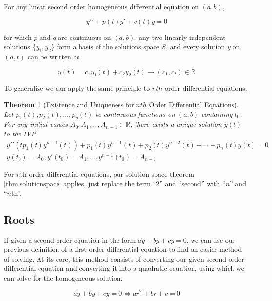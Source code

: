 \documentclass[12pt, landscape, twocolumn]{article}
\newtheorem{thm}{Theorem}
\begin{document}
    For any linear second order homogeneous differential equation on $(a, b)$,

        \[
            y\prime\prime + p(t) y\prime + q(t)y = 0
        \]

    for which $p$ and $q$ are continuous on $(a, b)$, any two linearly independent solutions $\{y_1, y_2\}$ form a basis of the solutions space $S$, and every solution $y$ on $(a, b)$ can be written as

        \[
            y(t) = c_1 y_1(t) + c_2 y_2(t) \to (c_1, c_2) \in \mathbb{R}
        \]

    To generalize we can apply the same principle to $nth$ order differential equations.

        \begin{thm}[Existence and Uniqueness for $nth$ Order Differential Equations]\label{thm:neau}
        Let $p_1(t), p_2(t), \dots, p_n(t)$ be continuous functions on $(a, b)$ containing $t_0$. For any initial values $A_0, A_1, \dots, A_{n-1} \in \mathbb{R}$, there exists a unique solution $y(t)$ to the IVP
        \[
        \begin{aligned}
            y\prime\prime(tp_1(t)y^{n - 1}(t)) + p_1(t)y^{n - 1}(t) + p_2(t)y^{n - 2}(t) + \cdots + p_n(t)y(t) = 0\\
            y(t_0) = A_0, y\prime(t_0) = A_1, \dots, y^{n - 1}(t_0) = A_{n-1}
        \end{aligned}
        \]
    \end{thm}

    For $n$th order differential equations, our solution space theorem \eqref{thm:solutionspace} applies, just replace the term ``2'' and ``second'' with ``$n$'' and ``$n$th''.

    \subsection{Roots}\label{sec:2deroots}
    If given a second order equation in the form $a \ddot{y} + b \dot{y} + cy = 0$, we can use our previous definition of a first order differential equation to find an easier method of solving. At its core, this method consists of converting our given second order differential equation and converting it into a quadratic equation, using which we can solve for the homogeneous solution.

        \begin{equation}\label{eq:2de-quad}
            a \ddot{y} + b \dot{y} + cy = 0 \Leftrightarrow ar^2 + br + c = 0
        \end{equation}
\end{document}
